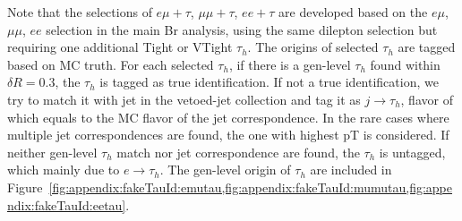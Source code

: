 \noindent Note that the selections of $e\mu+\tau$, $\mu\mu+\tau$, $ee+\tau$ are developed based on the $e\mu$, $\mu\mu$, $ee$ selection in the main Br analysis,
using the same dilepton selection but requiring one additional Tight or VTight $\tau_h$. The origins of selected $\tau_h$ are tagged based on MC truth.  For each selected $\tau_h$, if there is a gen-level $\tau_h$ found within $\delta R = 0.3$, the $\tau_h$ is tagged as true identification.  If not a true identification, we try to match it with jet in the vetoed-jet collection and tag it as $j \to \tau_h$, flavor of which equals to the MC flavor of the jet correspondence.  In the rare cases where multiple jet correspondences are found, the one with highest pT is considered.  If neither gen-level $\tau_h$ match nor jet correspondence are found, the $\tau_h$ is untagged, which mainly due to $e \to \tau_h$. The gen-level  origin of $\tau_h$ are included in Figure~\ref{fig:appendix:fakeTauId:emutau,fig:appendix:fakeTauId:mumutau,fig:appendix:fakeTauId:eetau}.


